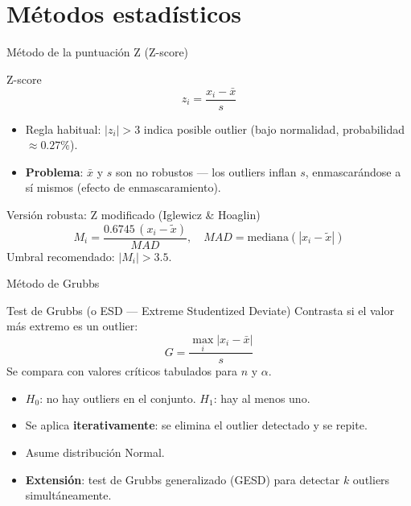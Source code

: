 \documentclass[aspectratio=169]{beamer}
\begin{document}
\section{Métodos estadísticos}

\begin{frame}{Método de la puntuación Z (Z-score)}
  \begin{block}{Z-score}
    \[
      z_i = \frac{x_i - \bar{x}}{s}
    \]
  \end{block}
  \begin{itemize}
    \item Regla habitual: $|z_i| > 3$ indica posible outlier (bajo normalidad, probabilidad $\approx 0.27\%$).
    \item \textbf{Problema}: $\bar{x}$ y $s$ son no robustos — los outliers inflan $s$, enmascarándose a sí mismos (efecto de enmascaramiento).
  \end{itemize}
  \bigskip
  \begin{alertblock}{Versión robusta: Z modificado (Iglewicz \& Hoaglin)}
    \[
      M_i = \frac{0.6745\,(x_i - \tilde{x})}{MAD}, \quad MAD = \text{mediana}(|x_i - \tilde{x}|)
    \]
    Umbral recomendado: $|M_i| > 3.5$.
  \end{alertblock}
\end{frame}

\begin{frame}{Método de Grubbs}
  \begin{block}{Test de Grubbs (o ESD — Extreme Studentized Deviate)}
    Contrasta si el valor más extremo es un outlier:
    \[
      G = \frac{\max_i |x_i - \bar{x}|}{s}
    \]
    Se compara con valores críticos tabulados para $n$ y $\alpha$.
  \end{block}
  \bigskip
  \begin{itemize}
    \item $H_0$: no hay outliers en el conjunto. \quad $H_1$: hay al menos uno.
    \item Se aplica \textbf{iterativamente}: se elimina el outlier detectado y se repite.
    \item Asume distribución Normal.
    \item \textbf{Extensión}: test de Grubbs generalizado (GESD) para detectar $k$ outliers simultáneamente.
  \end{itemize}
\end{frame}
\end{document}
